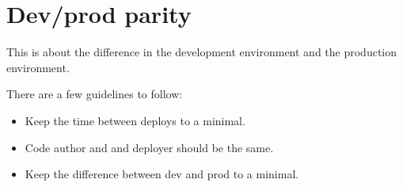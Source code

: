 \section*{Dev/prod parity}
This is about the difference in the development environment and the production environment.

There are a few guidelines to follow:
\begin{itemize}
\item Keep the time between deploys to a minimal.
\item Code author and and deployer should be the same.
\item Keep the difference between dev and prod to a minimal.
\end{itemize}
